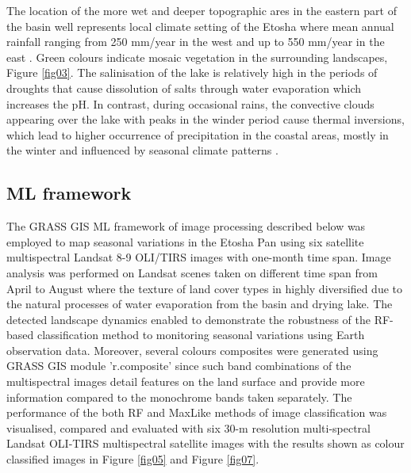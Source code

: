 \documentclass[climate,article,submit,pdftex,moreauthors]{Definitions/mdpi}
\begin{document}
The location of the more wet and deeper topographic ares in the eastern part of the basin well represents local climate setting of the Etosha where mean annual rainfall ranging from 250 mm/year in the west and up to 550 mm/year in the east \cite{Koeniger}. Green colours indicate mosaic vegetation in the surrounding landscapes, Figure \ref{fig03}. {The salinisation of the lake is relatively high in the periods of droughts that cause dissolution of salts through water evaporation which increases the pH. In contrast, during occasional rains, the convective clouds appearing over the lake with peaks in the winder period cause thermal inversions, which lead to higher occurrence of precipitation in the coastal areas, mostly in the winter and influenced by seasonal climate patterns} \cite{SHIKANGALAH2022151974}.

\subsection{ML framework}

The GRASS GIS ML framework of image processing described below was employed to map seasonal variations in the Etosha Pan using six satellite multispectral Landsat 8-9 OLI/TIRS images with one-month time span. Image analysis was performed on Landsat scenes taken on different time span from April to August where the texture of land cover types in highly diversified due to the natural processes of water evaporation from the basin and drying lake. The detected landscape dynamics enabled to demonstrate the robustness of the RF-based classification method to monitoring seasonal variations using Earth observation data. Moreover, several colours composites were generated using GRASS GIS module 'r.composite' since such band combinations of the multispectral images detail features on the land surface  and provide more information compared to the monochrome bands taken separately. The performance of the both RF and MaxLike methods of image classification was visualised, compared  and evaluated with six 30-m resolution multi-spectral Landsat OLI-TIRS multispectral satellite images with the results shown as colour classified images in Figure \ref{fig05} and Figure \ref{fig07}. 
\end{document}
